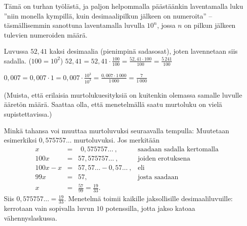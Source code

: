 Tämä on turhan työlästä, ja paljon helpommalla päästäänkin laventamalla luku ''niin monella kympillä, kuin desimaalipilkun jälkeen on numeroita'' -- täsmällisemmin sanottuna laventamalla luvulla $10^n$, jossa $n$ on pilkun jälkeen tulevien numeroiden määrä.

\begin{esimerkki}
Luvussa $52,41$ kaksi desimaalia (pienimpinä sadasosat), joten lavennetaan siis sadalla. ($100=10^2$)
$52,41 = 52,41 \cdot  \frac{100}{100} = \frac{52,41 \cdot 100}{100} = \frac{5\,241}{100}$
\end{esimerkki}

\begin{esimerkki}
$0,007 = 0,007 \cdot 1 = 0,007 \cdot \frac{10^3}{10^3} = \frac{0,007 \cdot 1\,000}{1\,000} = \frac{7}{1\,000}$
\end{esimerkki}

(Muista, että erilaisia murtolukuesityksiä on kuitenkin olemassa samalle luvulle ääretön määrä. Saattaa olla, että menetelmällä saatu murtoluku on vielä supistettavissa.)

Minkä tahansa  voi muuttaa murtoluvuksi seuraavalla tempulla: Muutetaan esimerkiksi $0,575757\ldots$ murtoluvuksi. Jos merkitään
\[
\begin{array}{rcll}
x &=& \ \, 0,575757 \ldots\ , &\textrm{saadaan sadalla kertomalla} \\
100x &=& 57,575757 \ldots \ , &\textrm{joiden erotuksena} \\
100x - x &=& 57,57 \ldots - 0,57 \ldots \ , & \textrm{eli} \\
99x &=& 57, & \textrm{josta saadaan} \\
x &=& \frac{57}{99} = \frac{19}{33}.
\end{array}
\]
Siis $0,575757\ldots = \frac{19}{33}$. Menetelmä toimii kaikille jaksollisille desimaaliluvuille: kerrotaan vain sopivalla luvun $10$ potenssilla, jotta jakso katoaa vähennyslaskussa.

